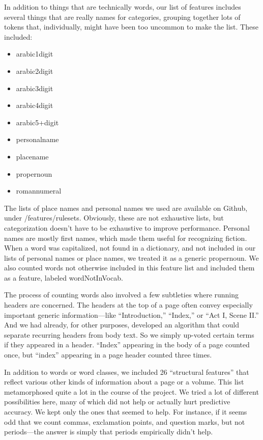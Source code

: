 \documentclass[paper=a4, fontsize=12pt]{scrartcl}
\numberwithin{equation}{section}		%
\numberwithin{figure}{section}			%
\numberwithin{table}{section}				%
\begin{document}
In addition to things that are technically words, our list of features includes several things that are really names for categories, grouping together lots of tokens that, individually, might have been too uncommon to make the list. These included:
\begin{itemize}
\item arabic1digit
\item arabic2digit
\item arabic3digit
\item arabic4digit
\item arabic5+digit
\item personalname
\item placename
\item propernoun
\item romannumeral
\end{itemize}
The lists of place names and personal names we used are available on Github, under /features/rulesets. Obviously, these are not exhaustive lists, but categorization doesn't have to be exhaustive to improve performance. Personal names are mostly first names, which made them useful for recognizing fiction. When a word was capitalized, not found in a dictionary, and not included in our lists of personal names or place names, we treated it as a generic propernoun. We also counted words not otherwise included in this feature list and included them as a feature, labeled wordNotInVocab.

The process of counting words also involved a few subtleties where running headers are concerned. The headers at the top of a page often convey especially important generic information---like ``Introduction,'' ``Index,'' or ``Act I, Scene II.'' And we had already, for other purposes, developed an algorithm that could separate recurring headers from body text. So we simply up-voted certain terms if they appeared in a header. ``Index'' appearing in the body of a page counted once, but ``index'' appearing in a page header counted three times.

In addition to words or word classes, we included 26 ``structural features'' that reflect various other kinds of information about a page or a volume. This list metamorphosed quite a lot in the course of the project. We tried a lot of different possibilities here, many of which did not help or actually hurt predictive accuracy. We kept only the ones that seemed to help. For instance, if it seems odd that we count commas, exclamation points, and question marks, but not periods---the answer is simply that periods empirically didn't help.
\end{document}
